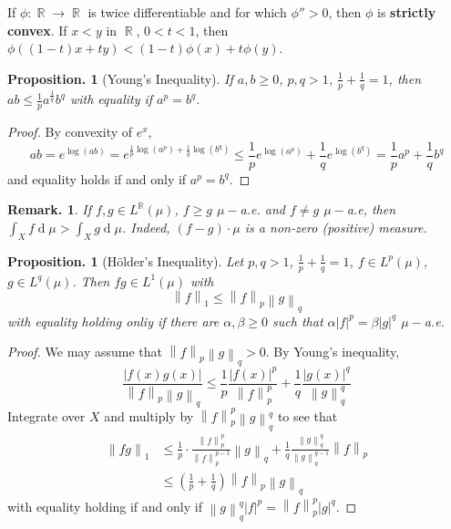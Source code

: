 \documentclass[11pt, a4paper]{memoir}
\DeclareMathOperator{\R}{{\mathbb{R}}}
\newcommand{\norm}[1]{\ensuremath{\left\lVert#1\right\rVert}}
\theoremstyle{change}
\newtheorem{proposition}[theorem]{Proposition.}
\theoremstyle{plain}
\theoremstyle{nonumberplain}
\newtheorem{remark}{Remark.}
\newtheorem{proof}{Proof}
\renewcommand{\d}[1]{\ensuremath{\operatorname{d}\!{#1}}}
\numberwithin{equation}{section}
\begin{document}
If $\phi:\R\to\R$ is twice differentiable and for which $\phi''>0$, then $\phi$ is \textbf{strictly convex}.
If $x<y$ in $\R$, $0<t<1$, then $\phi((1-t)x+ty)<(1-t)\phi(x)+t\phi(y)$.
\begin{proposition}[Young's Inequality]
    If $a,b\geq 0$, $p,q>1$, $\frac{1}{p}+\frac{1}{q}=1$, then $ab\leq\frac{1}{p}a^\frac{1}{q}b^q$ with equality if $a^p=b^q$.
\end{proposition}
\begin{proof}
    By convexity of $e^x$,
    \begin{equation*}
        ab=e^{\log(ab)}=e^{\frac{1}{p}\log(a^p)+\frac{1}{q}\log(b^q)}\leq\frac{1}{p}e^{\log(a^p)}+\frac{1}{q}e^{\log(b^q)}=\frac{1}{p}a^p+\frac{1}{q}b^q
    \end{equation*}
    and equality holds if and only if $a^p=b^q$.
\end{proof}
\begin{remark}
    If $f,g\in L^{\R}(\mu)$, $f\geq g$ $\mu-$a.e. and $f\neq g$ $\mu-$a.e, then $\int_X f\d{\mu}>\int_X g\d{\mu}$.
    Indeed, $(f-g)\cdot\mu$ is a non-zero (positive) measure.
\end{remark}
\begin{proposition}[H\"older's Inequality]
    Let $p,q>1$, $\frac{1}{p}+\frac{1}{q}=1$, $f\in L^p(\mu)$, $g\in L^q(\mu)$.
    Then $fg\in L^1(\mu)$ with
    \begin{equation*}
        \norm{f}_1\leq\norm{f}_p\norm{g}_q
    \end{equation*}
    with equality holding onliy if there are $\alpha,\beta\geq 0$ such that $\alpha|f|^p=\beta|g|^q$ $\mu-$a.e.
\end{proposition}
\begin{proof}
    We may assume that $\norm{f}_p\norm{g}_q>0$.
    By Young's inequality,
    \begin{equation*}
        \frac{|f(x)g(x)|}{\norm{f}_p\norm{g}_q}\leq\frac{1}{p}\frac{|f(x)|^p}{\norm{f}_p^p}+\frac{1}{q}\frac{|g(x)|^q}{\norm{g}_q^q}
    \end{equation*}
    Integrate over $X$ and multiply by $\norm{f}_p^p\norm{g}_q^q$ to see that
    \begin{align*}
        \norm{fg}_1 &\leq\frac{1}{p}\cdot\frac{\norm{f}_p^p}{\norm{f}_p^{p-1}}\norm{g}_q+\frac{1}{q}\frac{\norm{g}_q^q}{\norm{g}_q^{q-1}}\norm{f}_p\\
                    &\leq\left(\frac{1}{p}+\frac{1}{q}\right)\norm{f}_p\norm{g}_q
    \end{align*}
    with equality holding if and only if $\norm{g}_q^q|f|^p=\norm{f}_p^p|g|^q$.
\end{proof}
\end{document}
